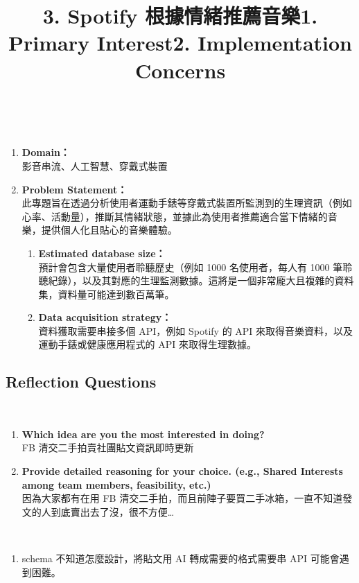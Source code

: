 \ \\
\title{\bf{3. Spotify 根據情緒推薦音樂}}
\begin{enumerate}
    \item {\bf{Domain：}} \\影音串流、人工智慧、穿戴式裝置
    \item {\bf{Problem Statement：}} \\此專題旨在透過分析使用者運動手錶等穿戴式裝置所監測到的生理資訊（例如心率、活動量），推斷其情緒狀態，並據此為使用者推薦適合當下情緒的音樂，提供個人化且貼心的音樂體驗。
        \begin{enumerate}
            \item {\bf{Estimated database size：}} \\預計會包含大量使用者聆聽歷史（例如 1000 名使用者，每人有 1000 筆聆聽紀錄），以及其對應的生理監測數據。這將是一個非常龐大且複雜的資料集，資料量可能達到數百萬筆。
            \item {\bf{Data acquisition strategy：}} \\資料獲取需要串接多個 API，例如 Spotify 的 API 來取得音樂資料，以及運動手錶或健康應用程式的 API 來取得生理數據。
        \end{enumerate}
\end{enumerate}

\subsection{Reflection Questions}
\ \\
\title{\bf{1. Primary Interest}} 
\begin{enumerate}
    \item {\bf{Which idea are you the most interested in doing?}} \\FB 清交二手拍賣社團貼文資訊即時更新
    \item {\bf{Provide detailed reasoning for your choice. (e.g., Shared Interests among team members, feasibility, etc.)}} \\因為大家都有在用 FB 清交二手拍，而且前陣子要買二手冰箱，一直不知道發文的人到底賣出去了沒，很不方便…
\end{enumerate}
\ \\
\title{\bf{2. Implementation Concerns}}
\begin{enumerate}
    \item schema 不知道怎麼設計，將貼文用 AI 轉成需要的格式需要串 API 可能會遇到困難。
\end{enumerate}